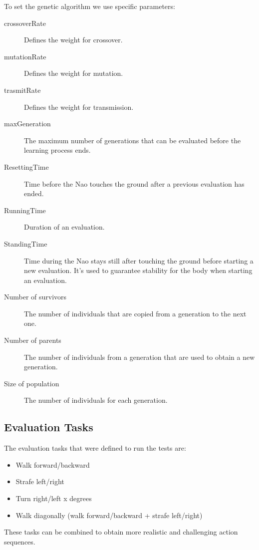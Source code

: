\documentclass{article}
\begin{document}
To set the genetic algorithm we use specific parameters:

\begin{description}
\item[crossoverRate] Defines the weight for crossover.
\item[mutationRate] Defines the weight for mutation.
\item[trasmitRate] Defines the weight for transmission.
\item[maxGeneration] The maximum number of generations that can be evaluated before the learning process ends. 

\item[ResettingTime] Time before the Nao touches the ground after a previous evaluation has ended.
\item[RunningTime] Duration of an evaluation.
\item[StandingTime] Time during the Nao stays still after touching the ground before starting a new evaluation. It's used to guarantee stability for the body when starting an evaluation.
\item[Number of survivors] The number of individuals that are copied from a generation to the next one. 
\item[Number of parents] The number of individuals from a generation that are used to obtain a new generation.
\item[Size of population] The number of individuals for each generation.

\end{description}

\subsection{Evaluation Tasks}

The evaluation tasks that were defined to run the tests are:

\begin{itemize}
\item Walk forward/backward 
\item Strafe left/right 
\item Turn right/left x degrees 
\item Walk diagonally (walk forward/backward + strafe left/right) 

\end{itemize}

These tasks can be combined to obtain more realistic and challenging action sequences.
\end{document}
